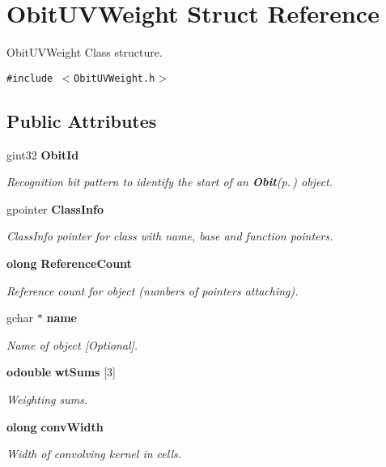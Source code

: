\section{Obit\-UVWeight Struct Reference}
\label{structObitUVWeight}
Obit\-UVWeight Class structure.  


{\tt \#include $<$Obit\-UVWeight.h$>$}

\subsection*{Public Attributes}
\begin{CompactItemize}
\item 
gint32 {\bf Obit\-Id}
\begin{CompactList}\small\item\em Recognition bit pattern to identify the start of an {\bf Obit}{\rm (p.\,\pageref{structObit})} object. \item\end{CompactList}\item 
gpointer {\bf Class\-Info}
\begin{CompactList}\small\item\em Class\-Info pointer for class with name, base and function pointers. \item\end{CompactList}\item 
{\bf olong} {\bf Reference\-Count}
\begin{CompactList}\small\item\em Reference count for object (numbers of pointers attaching). \item\end{CompactList}\item 
gchar $\ast$ {\bf name}
\begin{CompactList}\small\item\em Name of object [Optional]. \item\end{CompactList}\item 
{\bf odouble} {\bf wt\-Sums} [3]
\begin{CompactList}\small\item\em Weighting sums. \item\end{CompactList}\item 
{\bf olong} {\bf conv\-Width}
\begin{CompactList}\small\item\em Width of convolving kernel in cells. \item\end{CompactList}\item 

\end{CompactItemize}

